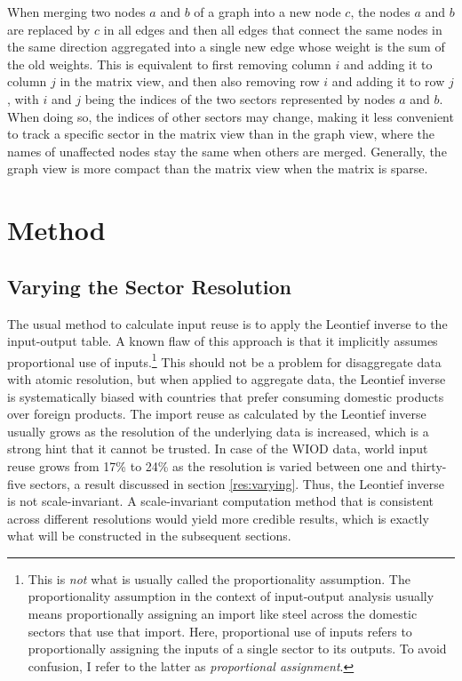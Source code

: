 \documentclass{paper}
\begin{document}
When merging two nodes $a$ and $b$ of a graph into a new node $c$, the nodes $a$ and $b$ are replaced by $c$ in all edges and then all edges that connect the same nodes in the same direction aggregated into a single new edge whose weight is the sum of the old weights. This is equivalent to first removing column $i$ and adding it to column $j$ in the matrix view, and then also removing row $i$ and adding it to row $j$, with $i$ and $j$ being the indices of the two sectors represented by nodes $a$ and $b$. When doing so, the indices of other sectors may change, making it less convenient to track a specific sector in the matrix view than in the graph view, where the names of unaffected nodes stay the same when others are merged. Generally, the graph view is more compact than the matrix view when the matrix is sparse.

\section{Method}
\label{sec:method}

\subsection{Varying the Sector Resolution}
\label{Varying}
The usual method to calculate input reuse is to apply the Leontief inverse to the input-output table. A known flaw of this approach is that it implicitly assumes proportional use of inputs.\footnote{This is \emph{not} what is usually called the proportionality assumption. The proportionality assumption in the context of input-output analysis usually means proportionally assigning an import like steel across the domestic sectors that use that import. Here, proportional use of inputs refers to proportionally assigning the inputs of a single sector to its outputs. To avoid confusion, I refer to the latter as \emph{proportional assignment}.} This should not be a problem for disaggregate data with atomic resolution, but when applied to aggregate data, the Leontief inverse is systematically biased with countries that prefer consuming domestic products over foreign products. The import reuse as calculated by the Leontief inverse usually grows as the resolution of the underlying data is increased, which is a strong hint that it cannot be trusted. In case of the WIOD data, world input reuse grows from 17\% to 24\% as the resolution is varied between one and thirty-five sectors, a result discussed in section \ref{res:varying}. Thus, the Leontief inverse is not scale-invariant. A scale-invariant computation method that is consistent across different resolutions would yield more credible results, which is exactly what will be constructed in the subsequent sections.
\end{document}
